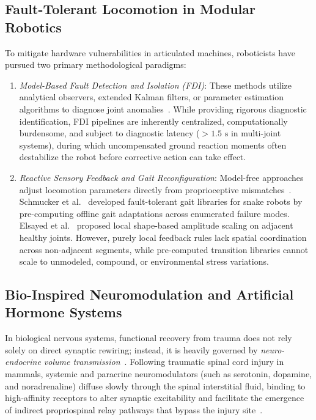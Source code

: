 \documentclass{iopjournal}
\begin{document}
\subsection{Fault-Tolerant Locomotion in Modular Robotics}
To mitigate hardware vulnerabilities in articulated machines, roboticists have pursued two primary methodological paradigms:
\begin{enumerate}
  \item \textit{Model-Based Fault Detection and Isolation (FDI)}: These methods utilize analytical observers, extended Kalman filters, or parameter estimation algorithms to diagnose joint anomalies~\cite{elsayed2021,tanaka2015}. While providing rigorous diagnostic identification, FDI pipelines are inherently centralized, computationally burdensome, and subject to diagnostic latency ($>1.5\text{ s}$ in multi-joint systems), during which uncompensated ground reaction moments often destabilize the robot before corrective action can take effect.
  \item \textit{Reactive Sensory Feedback and Gait Reconfiguration}: Model-free approaches adjust locomotion parameters directly from proprioceptive mismatches~\cite{sartoretti2019,righetti2008}. Schmucker et al.~\cite{schmucker2022} developed fault-tolerant gait libraries for snake robots by pre-computing offline gait adaptations across enumerated failure modes. Elsayed et al.~\cite{elsayed2021} proposed local shape-based amplitude scaling on adjacent healthy joints. However, purely local feedback rules lack spatial coordination across non-adjacent segments, while pre-computed transition libraries cannot scale to unmodeled, compound, or environmental stress variations.
\end{enumerate}

\subsection{Bio-Inspired Neuromodulation and Artificial Hormone Systems}
In biological nervous systems, functional recovery from trauma does not rely solely on direct synaptic rewiring; instead, it is heavily governed by \textit{neuro-endocrine volume transmission}~\cite{bargmann2012,sillar2014}. Following traumatic spinal cord injury in mammals, systemic and paracrine neuromodulators (such as serotonin, dopamine, and noradrenaline) diffuse slowly through the spinal interstitial fluid, binding to high-affinity receptors to alter synaptic excitability and facilitate the emergence of indirect propriospinal relay pathways that bypass the injury site~\cite{courtine2008,rossignol2011,courtine2009}.
\end{document}
